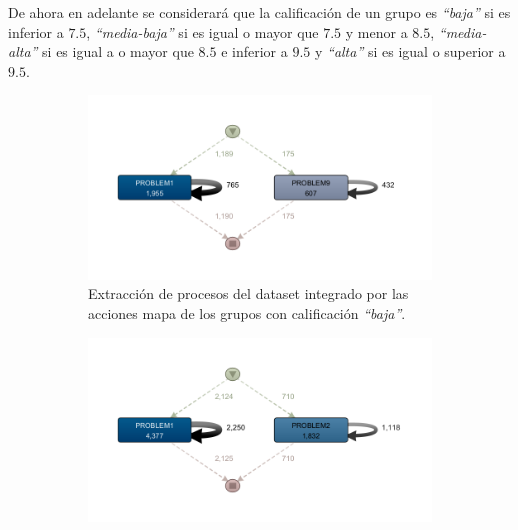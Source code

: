De ahora en adelante se considerará que la calificación de un grupo es \emph{``baja''} si es inferior a $7.5$, \emph{``media-baja''} si es igual o mayor que $7.5$ y menor a $8.5$, \emph{``media-alta''} si es igual a o mayor que $8.5$ e inferior a $9.5$ y \emph{``alta''} si es igual o superior a $9.5$.

\begin{figure}[H]
  \begin{subfigure}[t]{0.60\textwidth}
    \includegraphics[width=1.10\textwidth, height=0.80\textwidth]{imagenes/DISCO_map/Dataset FusionadoWorstGrades.png}
    \caption{Extracción de procesos del dataset integrado por las acciones mapa de los grupos con calificación \emph{``baja''}.}
    \label{fig:mapWorstGrades}
  \end{subfigure}
  \hfill
  \begin{subfigure}[t]{0.60\textwidth}
    \includegraphics[width=1.10\textwidth, height=0.80\textwidth]{imagenes/DISCO_map/Dataset FusionadoMidLowGrades.png}

\end{subfigure}
\end{figure}

